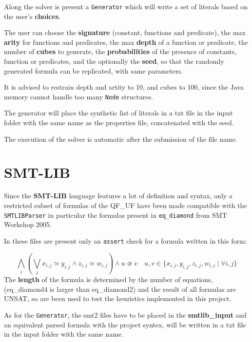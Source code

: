\documentclass[11pt,a4paper]{article}
\begin{document}
    Along the solver is present a \texttt{Generator} which will write a set of literals based on the user's \textbf{choices}.

    The user can choose the \textbf{signature} (constant, functions and predicate), the max \textbf{arity} for functions and predicates, the max \textbf{depth} of a function or predicate, the number of \textbf{cubes} to generate, the \textbf{probabilities} of the presence of constants, function or predicates, and the optionally the \textbf{seed}, so that the randomly generated formula can be replicated, with same parameters.

    It is advised to restrain depth and artity to 10, and cubes to 100, since the Java memory cannot handle too many \texttt{Node} structures.

    The generator will place the synthetic list of literals in a txt file in the input folder with the same name as the properties file, concatenated with the seed. 

    The execution of the solver is automatic after the submission of the file name.

    \section{SMT-LIB}

    Since the \textbf{SMT-LIB} language features a lot of definition and syntax, only a restricted subset of formulas of the QF\_UF have been made compatible with the \texttt{SMTLIBParser} in particular the formulas present in \texttt{eq\_diamond} from SMT Workshop 2005.

    In these files are present only an \texttt{assert} check for a formula written in this form:

    \begin{equation}
        \bigwedge_i \left(\bigvee_j x_{i,j} \simeq y_{i,j} \land z_{i,j} \simeq w_{i,j} \right) 
        \land u \not\simeq v \quad u,v \in \{x_{i,j}, y_{i,j}, z_{i,j}, w_{i,j} \mid \forall i,j\}
    \end{equation} 
    The \textbf{length} of the formula is determined by the number of equations, (eq\_diamond4 is larger than eq\_diamond2) and the result of all formulas are UNSAT, so are been used to test the heuristics implemented in this project.

    As for the \texttt{Generator}, the smt2 files have to be placed in the \textbf{smtlib\_input} and an equivalent parsed formula with the project syntex, will be written in a txt file in the input folder with the same name. 
\end{document}
